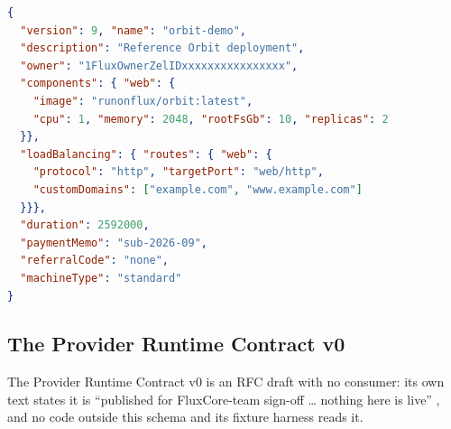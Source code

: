 \begin{lstlisting}[caption={A schema-conformant \specv{9} specification. Note the four
required, new-in-\specv{9} fields (\texttt{duration}, \texttt{paymentMemo},
\texttt{referralCode}, \texttt{machineType}) with no \FluxOS consumer
(Table~\ref{tab:v9-delta}); the keyed \texttt{components} map replacing \specv{8}'s
positional \texttt{compose} array; and \texttt{customDomains} pre-sorted per the
canonicalization \texttt{MUST} rule that nothing here enforces.},
label=lst:v9-example, language=json, basicstyle=\footnotesize\ttfamily]
{
  "version": 9, "name": "orbit-demo",
  "description": "Reference Orbit deployment",
  "owner": "1FluxOwnerZelIDxxxxxxxxxxxxxxxx",
  "components": { "web": {
    "image": "runonflux/orbit:latest",
    "cpu": 1, "memory": 2048, "rootFsGb": 10, "replicas": 2
  }},
  "loadBalancing": { "routes": { "web": {
    "protocol": "http", "targetPort": "web/http",
    "customDomains": ["example.com", "www.example.com"]
  }}},
  "duration": 2592000,
  "paymentMemo": "sub-2026-09",
  "referralCode": "none",
  "machineType": "standard"
}
\end{lstlisting}

\subsection{The Provider Runtime Contract v0}
\inprogress

The Provider Runtime Contract v0 is an RFC draft with no consumer: its own text states it is
``published for FluxCore-team sign-off \dots{} nothing here is live''
, and no code outside this schema and its
fixture harness reads it.

